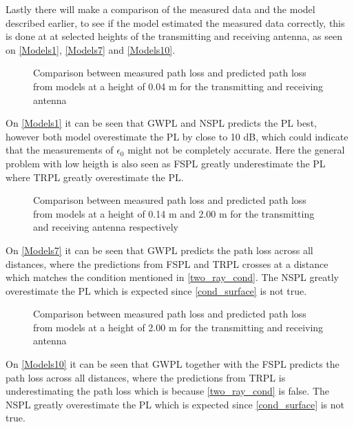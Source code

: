Lastly there will make a comparison of the measured data and the model described earlier, to see if the model estimated the measured data correctly, this is done at at selected heights of the transmitting and receiving antenna, as seen on \autoref{Models1}, \autoref{Models7} and \autoref{Models10}.



\begin{figure}[!htbp]
\centering

\caption{Comparison between measured path loss and predicted path loss from models at a height of 0.04 m for the transmitting and receiving antenna}
\label{Models1}
\end{figure}

On \autoref{Models1} it can be seen that GWPL and NSPL predicts the PL best, however both model overestimate the PL by close to 10 dB, which could indicate that the measurements of $\epsilon_0$ might not be completely accurate. Here the general problem with low heigth is also seen as FSPL greatly underestimate the PL where TRPL greatly overestimate the PL.

\begin{figure}[!htbp]
\centering

\caption{Comparison between measured path loss and predicted path loss from models at a height of 0.14 m and 2.00 m for the transmitting and receiving antenna respectively}
\label{Models7}
\end{figure}

On \autoref{Models7} it can be seen that GWPL predicts the path loss across all distances, where the predictions from FSPL and TRPL crosses at a distance which matches the condition mentioned in \autoref{two_ray_cond}. The NSPL greatly overestimate the PL which is expected since \autoref{cond_surface} is not true.

\begin{figure}[!htbp]
\centering

\caption{Comparison between measured path loss and predicted path loss from models at a height of 2.00 m for the transmitting and receiving antenna}
\label{Models10}
\end{figure}

On \autoref{Models10} it can be seen that GWPL together with the FSPL predicts the path loss across all distances, where the predictions from TRPL is underestimating the path loss which is because \autoref{two_ray_cond} is false. The NSPL greatly overestimate the PL which is expected since \autoref{cond_surface} is not true.

